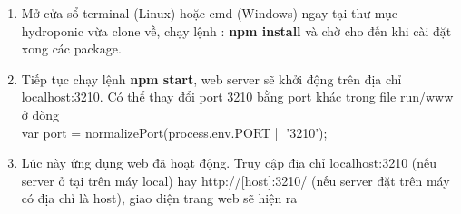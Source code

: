 \documentclass[a4paper,12pt,oneside]{article}
\begin{document}
\begin{enumerate}
	\item Mở cửa sổ terminal (Linux) hoặc cmd (Windows) ngay tại thư mục hydroponic vừa
clone về, chạy lệnh : \textbf{npm install} và chờ cho đến khi cài đặt xong các package.

	\item Tiếp tục chạy lệnh \textbf{npm start}, web server sẽ khởi động trên địa chỉ localhost:3210. Có
thể thay đổi port 3210 bằng port khác trong file run/www ở dòng \\
var port = normalizePort(process.env.PORT || '3210');

	\item Lúc này ứng dụng web đã hoạt động. Truy cập địa chỉ localhost:3210 (nếu server ở tại
trên máy local) hay http://[host]:3210/ (nếu server đặt trên máy có địa chỉ là host), giao
diện trang web sẽ hiện ra
	
	\end{enumerate}
\end{document}
